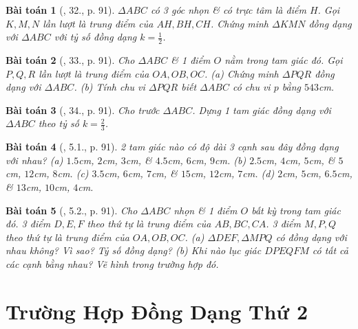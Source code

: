 \documentclass{article}
\newtheorem{baitoan}{Bài toán}
\begin{document}
\begin{baitoan}[\cite{SBT_Toan_8_tap_2}, 32., p. 91]
	$\Delta ABC$ có 3 góc nhọn \& có trực tâm là điểm $H$. Gọi $K,M,N$ lần lượt là trung điểm của $AH,BH,CH$. Chứng minh $\Delta KMN$ đồng dạng với $\Delta ABC$ với tỷ số đồng dạng $k = \frac{1}{2}$.
\end{baitoan}

\begin{baitoan}[\cite{SBT_Toan_8_tap_2}, 33., p. 91]
	Cho $\Delta ABC$ \& 1 điểm $O$ nằm trong tam giác đó. Gọi $P,Q,R$ lần lượt là trung điểm của $OA,OB,OC$. (a) Chứng minh $\Delta PQR$ đồng dạng với $\Delta ABC$. (b) Tính chu vi $\Delta PQR$ biết $\Delta ABC$ có chu vi $p$ bằng $543$\emph{cm}.
\end{baitoan}

\begin{baitoan}[\cite{SBT_Toan_8_tap_2}, 34., p. 91]
	Cho trước $\Delta ABC$. Dựng 1 tam giác đồng dạng với $\Delta ABC$ theo tỷ số $k = \frac{2}{3}$.
\end{baitoan}

\begin{baitoan}[\cite{SBT_Toan_8_tap_2}, 5.1., p. 91]
	2 tam giác nào có độ dài 3 cạnh sau đây đồng dạng với nhau? (a) $1.5$\emph{cm}, $2$\emph{cm}, $3$\emph{cm}, \& $4.5$\emph{cm}, $6$\emph{cm}, $9$\emph{cm}. (b) $2.5$\emph{cm}, $4$\emph{cm}, $5$\emph{cm}, \& $5$\emph{cm}, $12$\emph{cm}, $8$\emph{cm}. (c) $3.5$\emph{cm}, $6$\emph{cm}, $7$\emph{cm}, \& $15$\emph{cm}, $12$\emph{cm}, $7$\emph{cm}. (d) $2$\emph{cm}, $5$\emph{cm}, $6.5$\emph{cm}, \& $13$\emph{cm}, $10$\emph{cm}, $4$\emph{cm}.
\end{baitoan}

\begin{baitoan}[\cite{SBT_Toan_8_tap_2}, 5.2., p. 91]
	Cho $\Delta ABC$ nhọn \& 1 điểm $O$ bất kỳ trong tam giác đó. 3 điểm $D,E,F$ theo thứ tự là trung điểm của $AB,BC,CA$. 3 điểm $M,P,Q$ theo thứ tự là trung điểm của $OA,OB,OC$. (a) $\Delta DEF,\Delta MPQ$ có đồng dạng với nhau không? Vì sao? Tỷ số đồng dạng? (b) Khi nào lục giác $DPEQFM$ có tất cả các cạnh bằng nhau? Vẽ hình trong trường hợp đó.
\end{baitoan}


\section{Trường Hợp Đồng Dạng Thứ 2}
\end{document}
